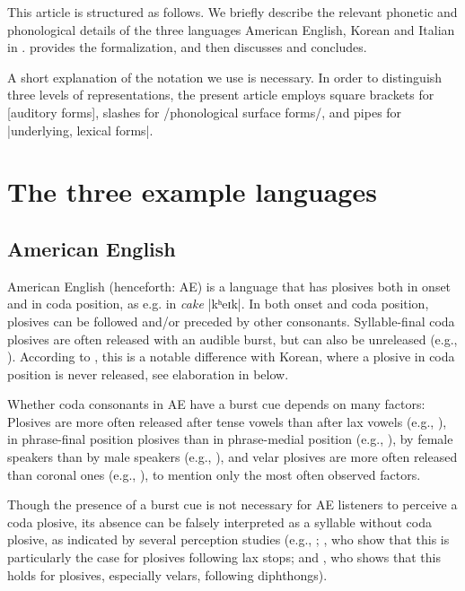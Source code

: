 \documentclass[output=paper,colorlinks,citecolor=brown]{langscibook}
\begin{document}
This article is structured as follows. We briefly describe the relevant phonetic and phonological details of the three languages American English, Korean and Italian in .  provides the formalization, and  then discusses and concludes.

A short explanation of the notation we use is necessary. In order to distinguish three levels of representations, the present article employs square brackets for [auditory forms], slashes for /phonological surface forms/, and pipes for |underlying, lexical forms|.

\section{The three example languages} \label{hamann:3ex}
\subsection{American English}\label{hamann:ae}
American English (henceforth: AE) is a language that has plosives both in onset and in coda position, as e.g. in \textit{cake} |kʰeɪk|. In both onset and coda position, plosives can be followed and/or preceded by other consonants. Syllable-final coda plosives are often released with an audible burst, but can also be unreleased (e.g., \cite{Rositzke1943,CrystalHouse1988,Davidson2011}). According to \citet{Kim1998}, this is a notable difference with Korean, where a plosive in coda position is never released, see elaboration in  below.

Whether coda consonants in AE have a burst cue depends on many factors: Plosives are more often released after tense vowels than after lax vowels (e.g., \cite{ParkerWalsh1981}), in phrase-final position plosives than in phrase-medial position (e.g., \cite{CrystalHouse1988}), by female speakers than by male speakers (e.g., \cite{Byrd1993}), and velar plosives are more often released than coronal ones (e.g., \cite{HalleHughesRadley1957,CrystalHouse1988,Byrd1993}), to mention only the most often observed factors.

Though the presence of a burst cue is not necessary for AE listeners to perceive a coda plosive, its absence can be falsely interpreted as a syllable without coda plosive, as indicated by several perception studies (e.g., \cite{Householder1956}; \cite{HalleHughesRadley1957}, who show that this is particularly the case for plosives following lax stops; and \cite{Lisker1999}, who shows that this holds for plosives, especially velars, following diphthongs).
\end{document}
